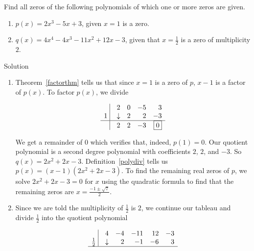 \ifvc
\begin{example}
Find all zeros of the following polynomials of which one or more zeros are given. 

\begin{enumerate}

\item   $p(x) = 2x^3-5x+3$, given $x=1$ is a zero.

\item   $q(x) = 4x^4-4x^3-11x^2+12x-3$, given that $x=\frac{1}{2}$ is a zero of multiplicity $2$.

\end{enumerate}


Solution 

\begin{enumerate}

\item  Theorem~\ref{factorthm} tells us that since $x=1$ is a zero of $p$, $x-1$ is a factor of $p(x)$.  To factor $p(x)$, we divide

\[\begin{array}{rrrrr}
  \, \, \vline& 2 & 0 & -5  & 3 \\

 1 \, \, \vline   & \downarrow &  2  &  2  & -3 \\ \hline
 \vline  & 2  &   2  & -3 &  \fbox{$0$}  \\  
\end{array}\]

We get a remainder of $0$ which verifies that, indeed, $p(1) = 0$.  Our quotient polynomial is a second degree polynomial with coefficients $2$, $2$, and $-3$. So $q(x) = 2x^2 + 2x - 3$.  Definition~\ref{polydiv} tells us $p(x) = (x-1)\left( 2x^2 + 2x - 3\right)$.  To find the remaining real zeros of $p$, we solve $2x^2 + 2x - 3=0$ for $x$ using the quadratic formula to find that the remaining zeros are $x = \frac{-1 \pm \sqrt{7}}{2}$. 

\item  Since we are told the multiplicity of $\frac{1}{2}$ is $2$, we continue our tableau and divide $\frac{1}{2}$ into the quotient polynomial

\[\begin{array}{rrrrrr}
\vline& 4 & -4 & -11  & 12 & -3 \\

  \frac{1}{2} \, \,  \vline  & \downarrow &  2  &  -1  & -6 & 3\\ \hline
   

\end{array}\]
\end{enumerate}
\end{example}
